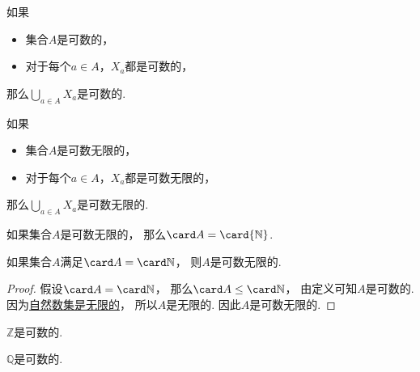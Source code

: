 \begin{proposition}
如果\begin{itemize}
	\item 集合\(A\)是可数的，
	\item 对于每个\(a \in A\)，\(X_a\)都是可数的，
\end{itemize}
那么\(\bigcup_{a \in A} X_a\)是可数的.
\end{proposition}

\begin{proposition}
如果\begin{itemize}
	\item 集合\(A\)是可数无限的，
	\item 对于每个\(a \in A\)，\(X_a\)都是可数无限的，
\end{itemize}
那么\(\bigcup_{a \in A} X_a\)是可数无限的.
\end{proposition}

\begin{proposition}
如果集合\(A\)是可数无限的，
那么\(\card A = \card{\mathbb{N}}\).
\end{proposition}

\begin{proposition}
如果集合\(A\)满足\(\card A = \card\mathbb{N}\)，
则\(A\)是可数无限的.
\begin{proof}
假设\(\card A = \card\mathbb{N}\)，
那么\(\card A \leq \card\mathbb{N}\)，
由定义可知\(A\)是可数的.
因为\hyperref[theorem:集合论.鸽巢原理.推论3]{自然数集是无限的}，
所以\(A\)是无限的.
因此\(A\)是可数无限的.
\end{proof}
\end{proposition}

\begin{corollary}
\(\mathbb{Z}\)是可数的.
\end{corollary}

\begin{corollary}
\(\mathbb{Q}\)是可数的.
\end{corollary}

